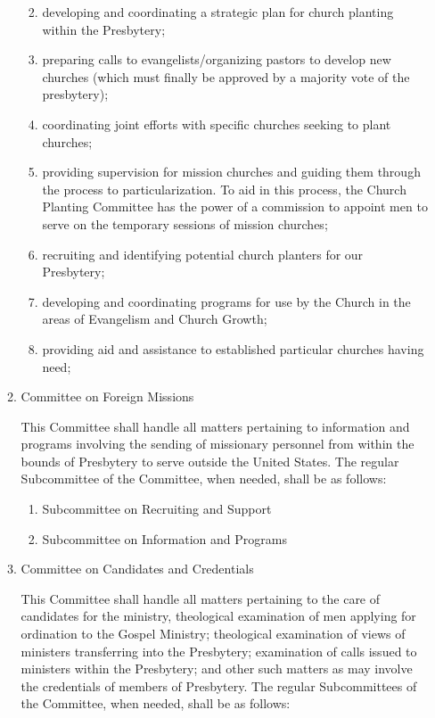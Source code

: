 \documentclass[
]{book}
\providecommand{\tightlist}{%
  \setlength{\itemsep}{0pt}\setlength{\parskip}{0pt}}
\begin{document}
\begin{enumerate}
\begin{enumerate}
    \begin{enumerate}
    \def\labelenumiii{\alph{enumiii}.}
    \tightlist
    \item
      developing and coordinating a strategic plan for church planting within the Presbytery;
    \item
      preparing calls to evangelists/organizing pastors to develop new churches (which must finally be approved by a majority vote of the presbytery);
    \item
      coordinating joint efforts with specific churches seeking to plant churches;
    \item
      providing supervision for mission churches and guiding them through the process to particularization. To aid in this process, the Church Planting Committee has the power of a commission to appoint men to serve on the temporary sessions of mission churches;
    \item
      recruiting and identifying potential church planters for our Presbytery;
    \item
      developing and coordinating programs for use by the Church in the areas of Evangelism and Church Growth;
    \item
      providing aid and assistance to established particular churches having need;
    \end{enumerate}
  \item
    Committee on Foreign Missions

    This Committee shall handle all matters pertaining to information and programs involving the sending of missionary personnel from within the bounds of Presbytery to serve outside the United States. The regular Subcommittee of the Committee, when needed, shall be as follows:

    \begin{enumerate}
    \def\labelenumiii{\alph{enumiii}.}
    \tightlist
    \item
      Subcommittee on Recruiting and Support
    \item
      Subcommittee on Information and Programs
    \end{enumerate}
  \item
    Committee on Candidates and Credentials

    This Committee shall handle all matters pertaining to the care of candidates for the ministry, theological examination of men applying for ordination to the Gospel Ministry; theological examination of views of ministers transferring into the Presbytery; examination of calls issued to ministers within the Presbytery; and other such matters as may involve the credentials of members of Presbytery. The regular Subcommittees of the Committee, when needed, shall be as follows:


\end{enumerate}
\end{enumerate}
\end{document}
